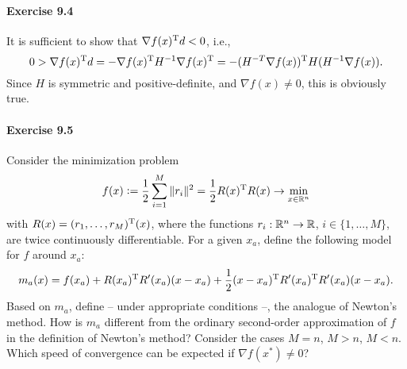\paragraph{Exercise 9.4}
It is sufficient to show that $\nabla f(x)^{\text{\upshape T}} d < 0$, i.e.,
\[
0
> \nabla f(x)^{\text{\upshape T}} d
= - \nabla f(x)^{\text{\upshape T}} H^{-1} \nabla f(x)^{\text{\upshape T}}
= - (H^{-T} \nabla f(x))^{\text{\upshape T}} H (H^{-1} \nabla f(x)).
\]
Since $H$ is symmetric and positive-definite, and $\nabla f(x)\neq 0$, this is obviously true.


\paragraph{Exercise 9.5}
Consider the minimization problem
\[
  f(x)\mathrel{\mathop:}= \frac{1}{2}\sum_{i=1}^M\|r_i\|^2 = \frac{1}{2}R(x)^{\text{\upshape T}} R(x) \to \min_{x\in\mathbb{R}^n}
\]
with $R(x)=(r_1,\dots,r_M)^{\text{\upshape T}}(x)$, where the functions $r_i:\mathbb{R}^n\to\mathbb{R}$, $i\in\{1,\dots,M\}$, are twice continuously differentiable. For a given $x_a$, define the following model for $f$ around $x_a$:
\[
  m_a(x) = f(x_a)
         + R(x_a)^{\text{\upshape T}} R'(x_a)(x-x_a)
         + \frac{1}{2} (x-x_a)^{\text{\upshape T}} R'(x_a)^{\text{\upshape T}} R'(x_a)(x-x_a).
\]
Based on $m_a$, define -- under appropriate conditions --, the analogue of
Newton's method. How is $m_a$ different from the ordinary second-order
approximation of $f$ in the definition of Newton's method? Consider the cases
$M=n$, $M>n$, $M<n$. Which speed of convergence can be expected if $\nabla
f(x^*)\neq 0$?


